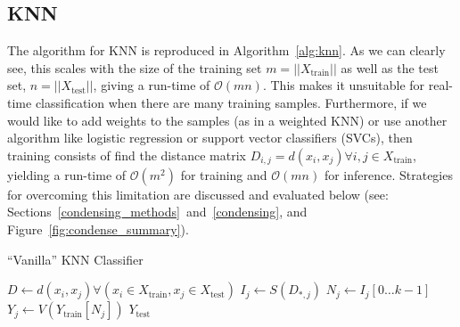 \documentclass[conference]{IEEEtran}
\begin{document}
\subsection{KNN}
\label{runtime}
The algorithm for KNN is reproduced in Algorithm~\ref{alg:knn}. As we can clearly see, this scales with the size of the training set $m = || X_{\text{train}} || $ as well as the test set, $n = || X_{\text{test}} ||$, giving a run-time of $\mathcal{O}(mn)$.
This makes it unsuitable for real-time classification when there are many training samples. 
Furthermore, if we would like to add weights to the samples (as in a weighted KNN) or use another algorithm like logistic regression or support vector classifiers (SVCs), then training consists of find the distance matrix $D_{i,j} = d(x_i, x_j) \forall i,j \in X_{\text{train}}$, yielding a run-time of $\mathcal{O}(m^2)$ for training and $\mathcal{O}(mn)$ for inference. Strategies for overcoming this limitation are discussed and evaluated below (see: Sections~\ref{condensing_methods}~and~\ref{condensing}, and Figure~\ref{fig:condense_summary}). 



\begin{algorithm}
\begin{algorithmic}
    \caption{``Vanilla'' KNN Classifier}
    \label{alg:knn}
    \label{alg:vanilla}
    \State $D \gets d(x_i,x_j) \forall \left( x_i \in X_{\text{train}}, x_j \in X_{\text{test}} \right)$  
       
        \State $I_j \gets S(D_{*,j})$ 
        \State $N_j \gets I_j[0 \ldots k-1]$ 
        \State $Y_j \gets V(Y_{\text{train}}[N_j])$ 
    \EndFor
    \State \Return $Y_{\text{test}}$
\end{algorithmic}
\end{algorithm}
\end{document}
